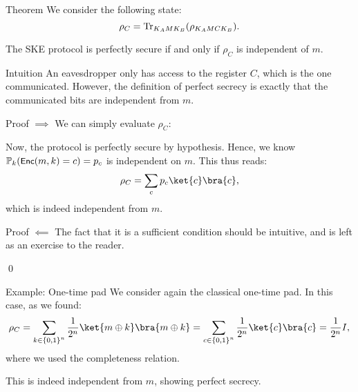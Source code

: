 \documentclass[a4paper]{article}
\begin{document}
\begin{parag}{Theorem}
    We consider the following state: 
    \[\rho_C = \Tr_{K_A M K_B}\left(\rho_{K_A M C K_B}\right).\]

    The SKE protocol is perfectly secure if and only if $\rho_C$ is independent of $m$.

    \begin{subparag}{Intuition}
        An eavesdropper only has access to the register $C$, which is the one communicated. However, the definition of perfect secrecy is exactly that the communicated bits are independent from $m$. 
    \end{subparag}

    \begin{subparag}{Proof $\implies$}
        We can simply evaluate $\rho_C$:
   
        Now, the protocol is perfectly secure by hypothesis. Hence, we know $\prob_k\left(\lang{Enc}\left(m, k\right) = c\right) = p_c$ is independent on $m$. This thus reads: 
        \[\rho_C = \sum_{c} p_c \ket{c}\bra{c},\]
        which is indeed independent from $m$.
    \end{subparag}

    \begin{subparag}{Proof $\impliedby$}
        The fact that it is a sufficient condition should be intuitive, and is left as an exercise to the reader.

        \qed
    \end{subparag}
\end{parag}

\begin{parag}{Example: One-time pad}
    We consider again the classical one-time pad. In this case, as we found: 
    \[\rho_C = \sum_{k \in \left\{0, 1\right\}^n} \frac{1}{2^n} \ket{m \oplus k}\bra{m \oplus k} = \sum_{c \in \left\{0, 1\right\}^n} \frac{1}{2^n} \ket{c}\bra{c} = \frac{1}{2^n} I,\]
    where we used the completeness relation. 

    This is indeed independent from $m$, showing perfect secrecy.
\end{parag}
\end{document}
